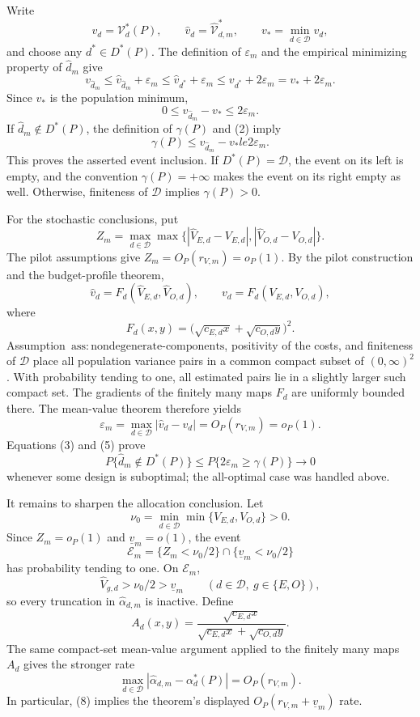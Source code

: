 Write
\[
 v_d=\mathcal V_d^*(P),\qquad
 \widehat v_d=\widehat{\mathcal V}_{d,m}^*,\qquad
 v_*=\min_{d\in\mathcal D}v_d,
\]
and choose any \(d^*\in D^*(P)\).  The definition of \(\varepsilon_m\) and the empirical minimizing property of \(\widehat d_m\) give
\[
 v_{\widehat d_m}
 \le \widehat v_{\widehat d_m}+\varepsilon_m
 \le \widehat v_{d^*}+\varepsilon_m
 \le v_{d^*}+2\varepsilon_m
 =v_*+2\varepsilon_m.
 \tag{1}
\]
Since \(v_*\) is the population minimum,
\[
 0\le v_{\widehat d_m}-v_*
 \le2\varepsilon_m.
 \tag{2}
\]
If \(\widehat d_m\notin D^*(P)\), the definition of \(\gamma(P)\) and (2) imply
\[
 \gamma(P)\le v_{\widehat d_m}-v_*le2\varepsilon_m.
 \tag{3}
\]
This proves the asserted event inclusion.  If \(D^*(P)=\mathcal D\), the event on its left is empty, and the convention \(\gamma(P)=+\infty\) makes the event on its right empty as well.  Otherwise, finiteness of \(\mathcal D\) implies \(\gamma(P)>0\).

For the stochastic conclusions, put
\[
 Z_m=\max_{d\in\mathcal D}\max\bigl\{
 |\widehat V_{E,d}-V_{E,d}|,
 |\widehat V_{O,d}-V_{O,d}|\bigr\}.
\]
The pilot assumptions give \(Z_m=O_P(r_{V,m})=o_P(1)\).  By the pilot construction and the budget-profile theorem,
\[
 \widehat v_d=F_d(\widehat V_{E,d},\widehat V_{O,d}),
 \qquad
 v_d=F_d(V_{E,d},V_{O,d}),
 \tag{4}
\]
where
\[
 F_d(x,y)=
 \bigl(\sqrt{c_{E,d}x}+\sqrt{c_{O,d}y}\bigr)^2.
\]
Assumption~\(\mathrm{ass{:}nondegenerate\text{-}components}\), positivity of the costs, and finiteness of \(\mathcal D\) place all population variance pairs in a common compact subset of \((0,\infty)^2\).  With probability tending to one, all estimated pairs lie in a slightly larger such compact set.  The gradients of the finitely many maps \(F_d\) are uniformly bounded there.  The mean-value theorem therefore yields
\[
 \varepsilon_m
 =\max_{d\in\mathcal D}|\widehat v_d-v_d|
 =O_P(r_{V,m})=o_P(1).
 \tag{5}
\]
Equations (3) and (5) prove
\[
 P\{\widehat d_m\notin D^*(P)\}
 \le P\{2\varepsilon_m\ge\gamma(P)\}
 \longrightarrow0
 \tag{6}
\]
whenever some design is suboptimal; the all-optimal case was handled above.

It remains to sharpen the allocation conclusion.  Let
\[
 \nu_0=\min_{d\in\mathcal D}\min\{V_{E,d},V_{O,d}\}>0.
\]
Since \(Z_m=o_P(1)\) and \(\underline v_m=o(1)\), the event
\[
 \mathcal E_m
 =\{Z_m<\nu_0/2\}\cap\{\underline v_m<\nu_0/2\}
 \tag{7}
\]
has probability tending to one.  On \(\mathcal E_m\),
\[
 \widehat V_{g,d}>\nu_0/2>\underline v_m
 \qquad(d\in\mathcal D,\ g\in\{E,O\}),
\]
so every truncation in \(\widehat\alpha_{d,m}\) is inactive.  Define
\[
 A_d(x,y)=
 \frac{\sqrt{c_{E,d}x}}
 {\sqrt{c_{E,d}x}+\sqrt{c_{O,d}y}}.
\]
The same compact-set mean-value argument applied to the finitely many maps \(A_d\) gives the stronger rate
\[
 \max_{d\in\mathcal D}
 |\widehat\alpha_{d,m}-\alpha_d^*(P)|
 =O_P(r_{V,m}).
 \tag{8}
\]
In particular, (8) implies the theorem's displayed \(O_P(r_{V,m}+\underline v_m)\) rate.

